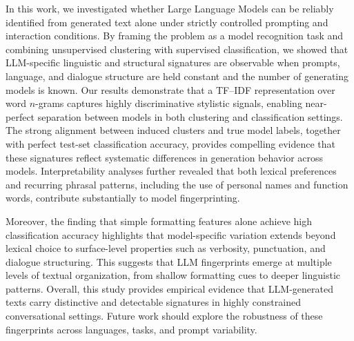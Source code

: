 \documentclass[11pt]{article}
\begin{document}
In this work, we investigated whether Large Language Models can be reliably identified from generated text alone under strictly controlled prompting and interaction conditions. By framing the problem as a model recognition task and combining unsupervised clustering with supervised classification, we showed that LLM-specific linguistic and structural signatures are observable when prompts, language, and dialogue structure are held constant and the number of generating models is known.
Our results demonstrate that a TF--IDF representation over word $n$-grams captures highly discriminative stylistic signals, enabling near-perfect separation between models in both clustering and classification settings. The strong alignment between induced clusters and true model labels, together with perfect test-set classification accuracy, provides compelling evidence that these signatures reflect systematic differences in generation behavior across models. Interpretability analyses further revealed that both lexical preferences and recurring phrasal patterns, including the use of personal names and function words, contribute substantially to model fingerprinting.

Moreover, the finding that simple formatting features alone achieve high classification accuracy highlights that model-specific variation extends beyond lexical choice to surface-level properties such as verbosity, punctuation, and dialogue structuring. This suggests that LLM fingerprints emerge at multiple levels of textual organization, from shallow formatting cues to deeper linguistic patterns.
Overall, this study provides empirical evidence that LLM-generated texts carry distinctive and detectable signatures in highly constrained conversational settings. Future work should explore the robustness of these fingerprints across languages, tasks, and prompt variability.





\end{document}
